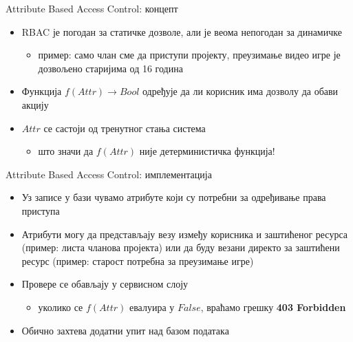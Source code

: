 \documentclass[aspectratio=169]{beamer}
\begin{document}
    \begin{frame}{Attribute Based Access Control: концепт}
        \begin{itemize}
            \item RBAC је погодан за статичке дозволе, али је веома непогодан за динамичке
            \begin{itemize}
                \item пример: само члан сме да приступи пројекту, преузимање видео игре је дозвољено старијима од 16 година
            \end{itemize}
            \item Функција \begin{math}f(Attr) \rightarrow Bool\end{math} одређује да ли корисник има дозволу да обави акцију
            \item \begin{math}Attr\end{math} се састоји од тренутног стања система
            \begin{itemize}
                \item што значи да \begin{math}f(Attr)\end{math} није детерминистичка функција!
            \end{itemize}
        \end{itemize}
    \end{frame}
    
    \begin{frame}{Attribute Based Access Control: имплементација}
        \begin{itemize}
            \item Уз записе у бази чувамо атрибуте који су потребни за одређивање права приступа
            \item Атрибути могу да представљају везу између корисника и заштићеног ресурса (пример: листа чланова пројекта) или да буду везани директо за заштићени ресурс (пример: старост потребна за преузимање игре)
            \item Провере се обављају у сервисном слоју
            \begin{itemize}
                \item уколико се \begin{math}f(Attr)\end{math} евалуира у \begin{math}False\end{math}, враћамо грешку \textbf{403 Forbidden}
            \end{itemize}
            \item Обично захтева додатни упит над базом података
        \end{itemize}
    \end{frame}
    
\end{document}

